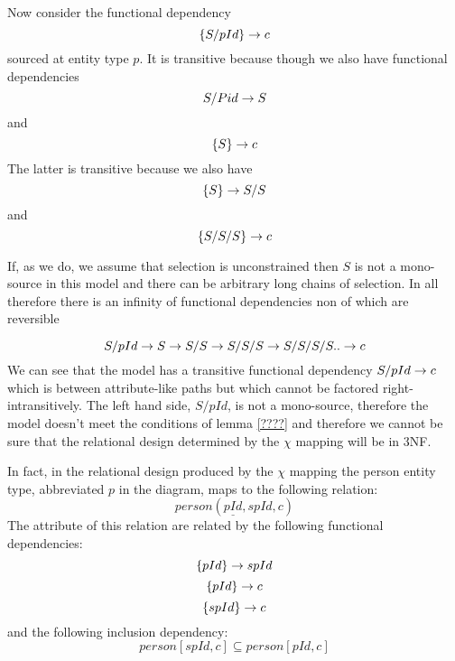 Now consider the functional dependency
\begin{equation*}
\left\{S/pId\right\} \rightarrow c
\end{equation*}
sourced at entity type $p$. It is transitive
because though we also have functional dependencies
\begin{equation*}
S/Pid \rightarrow S 
\end{equation*}
and
\begin{equation*}
\left\{S\right\} \rightarrow c
\end{equation*}
The latter is transitive because we also have
\begin{equation*}
\left\{S\right\} \rightarrow S/S
\end{equation*}
and
\begin{equation*}
\left\{S/S/S\right\} \rightarrow c 
\end{equation*} 

If, as we do, we assume that selection is unconstrained then $S$ is not a mono-source in this model and there can be arbitrary long chains of selection.
In  all therefore there is an infinity of functional dependencies non of which are reversible

\begin{equation}
S/pId \rightarrow S \rightarrow S/S \rightarrow S/S/S \rightarrow S/S/S/S .. \rightarrow c
\end{equation}
We can see that the model has a transitive functional dependency $S/pId \rightarrow c$ which is between
attribute-like paths but which cannot be factored right-intransitively. The left hand side, $S/pId$, is not a mono-source, therefore the model doesn't meet the conditions of lemma \ref{????} and therefore we cannot be sure that the relational design determined by the $\chi$ mapping will  be in 3NF.


In fact, in the relational design produced by the $\chi$ mapping the person entity type, abbreviated $p$ in the diagram, maps to the following relation:
\begin{equation}
\label{personrelation}
person(\underline{pId}, spId, c)
\end{equation}
The  attribute of this relation are related by the following  functional dependencies:
\begin{equation}
\left\{pId\right\} \rightarrow spId
\end{equation}
\begin{equation}
\label{colourfd}
\left\{pId\right\} \rightarrow c
\end{equation}
\begin{equation}
\left\{spId\right\} \rightarrow c
\end{equation}
and the following  inclusion dependency:
\begin{equation}
\label{spIdcolour1}
person[spId,c] \subseteq person[pId,c]
\end{equation}

